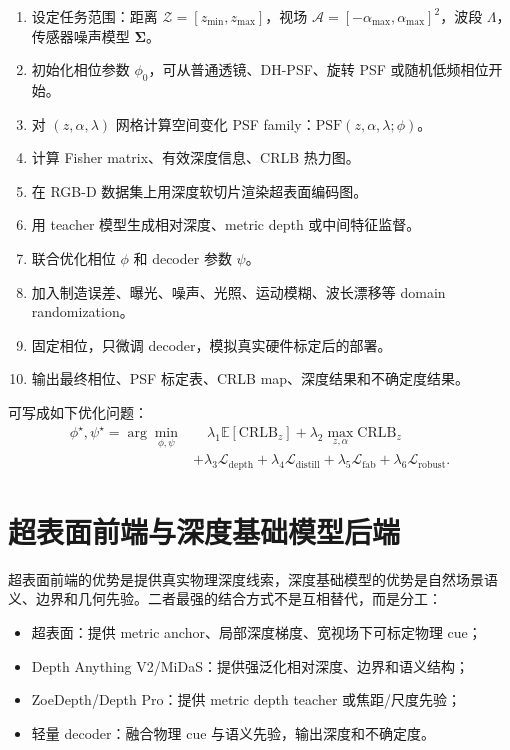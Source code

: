 \documentclass[11pt,a4paper,fontset=none]{ctexart}
\begin{document}
\begin{enumerate}
  \item 设定任务范围：距离 $\mathcal Z=[z_{\min},z_{\max}]$，视场 $\mathcal A=[-\alpha_{\max},\alpha_{\max}]^2$，波段 $\Lambda$，传感器噪声模型 $\bm\Sigma$。
  \item 初始化相位参数 $\phi_0$，可从普通透镜、DH-PSF、旋转 PSF 或随机低频相位开始。
  \item 对 $(z,\alpha,\lambda)$ 网格计算空间变化 PSF family：$\mathrm{PSF}(z,\alpha,\lambda;\phi)$。
  \item 计算 Fisher matrix、有效深度信息、CRLB 热力图。
  \item 在 RGB-D 数据集上用深度软切片渲染超表面编码图。
  \item 用 teacher 模型生成相对深度、metric depth 或中间特征监督。
  \item 联合优化相位 $\phi$ 和 decoder 参数 $\psi$。
  \item 加入制造误差、曝光、噪声、光照、运动模糊、波长漂移等 domain randomization。
  \item 固定相位，只微调 decoder，模拟真实硬件标定后的部署。
  \item 输出最终相位、PSF 标定表、CRLB map、深度结果和不确定度结果。
\end{enumerate}

可写成如下优化问题：
\begin{equation}
  \begin{aligned}
  \phi^\star,\psi^\star
  =
  \arg\min_{\phi,\psi}
  &\quad
  \lambda_1 \mathbb E[\mathrm{CRLB}_z]
  + \lambda_2 \max_{z,\alpha}\mathrm{CRLB}_z \\
  &+
  \lambda_3 \mathcal L_{\mathrm{depth}}
  + \lambda_4 \mathcal L_{\mathrm{distill}}
  + \lambda_5 \mathcal L_{\mathrm{fab}}
  + \lambda_6 \mathcal L_{\mathrm{robust}}.
  \end{aligned}
\end{equation}

\section{超表面前端与深度基础模型后端}

超表面前端的优势是提供真实物理深度线索，深度基础模型的优势是自然场景语义、边界和几何先验。二者最强的结合方式不是互相替代，而是分工：

\begin{itemize}
  \item 超表面：提供 metric anchor、局部深度梯度、宽视场下可标定物理 cue；
  \item Depth Anything V2/MiDaS：提供强泛化相对深度、边界和语义结构；
  \item ZoeDepth/Depth Pro：提供 metric depth teacher 或焦距/尺度先验；
  \item 轻量 decoder：融合物理 cue 与语义先验，输出深度和不确定度。
\end{itemize}
\end{document}
